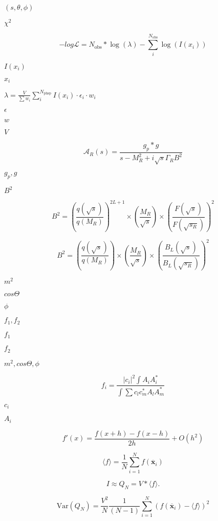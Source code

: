 \documentclass{article}
\begin{document}
$(s,\theta,\phi)$
\pagebreak

$\chi^{2}$
\pagebreak

\[ -log \mathcal{L} = N_{\mathrm{obs}} * \log(\lambda) - \sum_i^{N_{\mathrm{obs}}} \log(I(x_i)) \]
\pagebreak

$I(x_i)$
\pagebreak

$x_i$
\pagebreak

$ \lambda = \frac{V}{\sum w_i}\sum_i^{N_{\mathrm{phsp}}} I(x_i)\cdot \epsilon_i \cdot w_i $
\pagebreak

$ \epsilon $
\pagebreak

$ w $
\pagebreak

$ V $
\pagebreak

\[ \mathcal{A}_R(s) = \frac{g_p*g}{s - M_R^2 + i \sqrt{s} \Gamma_R B^2} \]
\pagebreak

$ g_p, g$
\pagebreak

$ B^2$
\pagebreak

\[ B^2 = \left( \frac{q(\sqrt{s})}{q(M_R)} \right)^{2L+1} \times \left( \frac{M_R}{\sqrt{s}} \right) \times \left( \frac{F(\sqrt{s})}{F(\sqrt{s_R})} \right)^{2} \]
\pagebreak

\[ B^2 = \left( \frac{q(\sqrt{s})}{q(M_R)} \right) \times \left( \frac{M_R}{\sqrt{s}} \right) \times \left( \frac{B_L(\sqrt{s})}{B_L(\sqrt{s_R})} \right)^{2} \]
\pagebreak

$m^2$
\pagebreak

$cos\Theta$
\pagebreak

$\phi$
\pagebreak

$f_1,f_2$
\pagebreak

$f_1$
\pagebreak

$f_2$
\pagebreak

$m^2, cos\Theta, \phi$
\pagebreak

\[ f_i = \frac{|c_i|^2 \int A_i A_i^*}{\int \sum c_l c_m^* A_l A_m^*} \]
\pagebreak

$c_i$
\pagebreak

$A_i$
\pagebreak

\[ f'(x) = \frac{f(x+h) - f(x-h)}{2h} + O(h^2) \]
\pagebreak

\[ \langle f \rangle =\frac{1}{N} \sum_{i=1}^N f(\overline{\mathbf{x}}_i) \]
\pagebreak

\[ I \approx Q_N = V*\langle f \rangle. \]
\pagebreak

\[ \mathrm{Var}(Q_N) = \frac{V^2}{N} \frac{1}{(N-1)} \sum_{i=1}^N \left (f(\overline{\mathbf{x}}_i) - \langle f \rangle \right )^2 \]
\pagebreak
\end{document}
